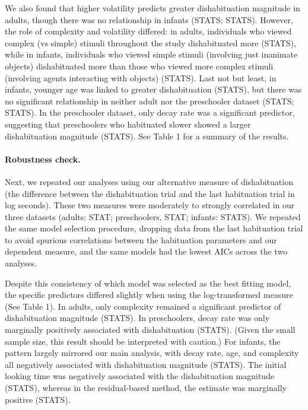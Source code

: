 \documentclass[10pt, letterpaper]{article}
\begin{document}
We also found that higher volatility predicts greater dishabituation
magnitude in adults, though there was no relationship in infants (STATS;
STATS). However, the role of complexity and volatility differed: in
adults, individuals who viewed complex (vs simple) stimuli throughout
the study dishabituated more (STATS), while in infants, individuals who
viewed simple stimuli (involving just inanimate objects) dishabituated
more than those who viewed more complex stimuli (involving agents
interacting with objects) (STATS). Last not but least, in infants,
younger age was linked to greater dishabituation (STATS), but there was
no significant relationship in neither adult nor the preschooler dataset
(STATS; STATS). In the preschooler dataset, only decay rate was a
significant predictor, suggesting that preschoolers who habituated
slower showed a larger dishabituation magnitude (STATS). See Table 1 for
a summary of the results.

\hypertarget{robustness-check.}{%
\paragraph{Robustness check.}\label{robustness-check.}}

Next, we repeated our analyses using our alternative measure of
dishabituation (the difference between the dishabituation trial and the
last habituation trial in log seconds). These two measures were
moderately to strongly correlated in our three datasets (adults: STAT;
preschoolers, STAT; infants: STATS). We repeated the same model
selection procedure, dropping data from the last habituation trial to
avoid spurious correlations between the habituation parameters and our
dependent measure, and the same models had the lowest AICs across the
two analyses.

Despite this consistency of which model was selected as the best fitting
model, the specific predictors differed slightly when using the
log-transformed measure (See Table 1). In adults, only complexity
remained a significant predictor of dishabituation magnitude (STATS). In
preschoolers, decay rate was only marginally positively associated with
dishabituation (STATS). (Given the small sample size, this result should
be interpreted with caution.) For infants, the pattern largely mirrored
our main analysis, with decay rate, age, and complexity all negatively
associated with dishabituation magnitude (STATS). The initial looking
time was negatively associated with the dishabituation magnitude
(STATS), whereas in the residual-based method, the estimate was
marginally positive (STATS).
\end{document}

